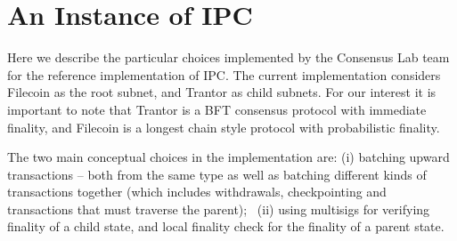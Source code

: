  \section{An Instance of IPC}
 \label{sec:impl-tmpl}
 
 Here we describe the particular choices implemented by the Consensus Lab team for the reference implementation of IPC.  
 The current implementation considers Filecoin as the root subnet, and Trantor as child subnets. For our interest it is important to note that Trantor is a BFT consensus protocol with immediate finality, and Filecoin is a longest chain style protocol with probabilistic finality. 
 
 The two main conceptual choices in the implementation are: (i) batching upward transactions -- both from the same type as well as batching different kinds of transactions together (which includes withdrawals, checkpointing and \postoffice transactions that must traverse the parent); \ (ii) using multisigs for verifying finality of a child state, and local finality check for the finality of a parent state.


